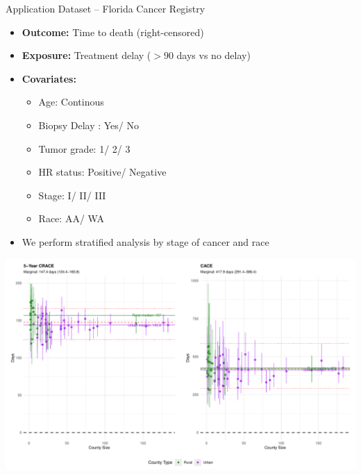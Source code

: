 \documentclass{beamer}
\begin{document}
\begin{frame}{Application Dataset – Florida Cancer Registry}
    \begin{itemize}
      \vfill \item \textbf{Outcome:} Time to death (right-censored)
      \vfill \item \textbf{Exposure:} Treatment delay (\(>90\) days vs no delay)
      \vfill \item \textbf{Covariates:}
      \begin{itemize}
        \vfill \item Age: Continous
        \vfill \item Biopsy Delay : Yes/ No
        \vfill \item Tumor grade: 1/ 2/ 3
        \vfill \item HR status: Positive/ Negative
        \vfill \item Stage:  I/ II/ III
        \vfill \item Race: AA/ WA
      
        
       
      \end{itemize}
      \vfill \item We perform stratified analysis by stage of cancer and race
    \end{itemize}
    \end{frame}
  


  \begin{frame}{}
    \includegraphics[width=\textwidth]{pics/CRACE_RACE_VS_SIZE.pdf}
  
  \end{frame}
\end{document}
